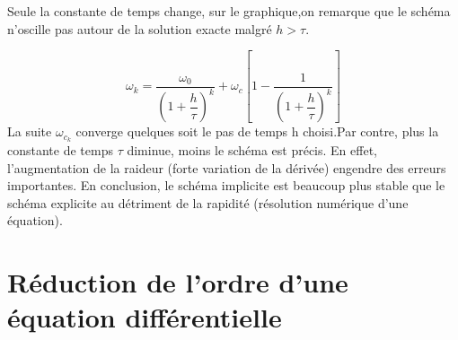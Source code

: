 \documentclass[10pt,fleqn]{article} %
\begin{document}
Seule la constante de temps change, sur le graphique,on remarque que le schéma n’oscille pas autour de la solution exacte malgré $h>\tau$.


$$\omega_{k}=\dfrac{\omega_{0}}{\left(1+\dfrac{h}{\tau}\right)^k} +\omega_c\left[1-\dfrac{1}{\left(1+\dfrac{h}{\tau}\right)^k}\right]$$
La suite $\omega_{c_k}$ converge quelques soit le pas de temps h choisi.Par contre, plus la constante de temps $\tau$ diminue, moins le schéma est précis. En effet, l’augmentation de la raideur (forte variation de la dérivée) engendre des erreurs importantes.
En conclusion, le schéma implicite est beaucoup plus stable que le schéma explicite au détriment de la rapidité (résolution numérique d’une équation).

\section{Réduction de l'ordre d'une équation différentielle}
\end{document}
